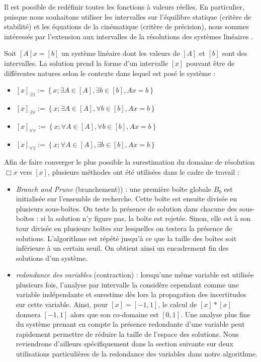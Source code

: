 Il est possible de red\'efinir toutes les fonctions \`a valeurs 
r\'eelles. En particulier, puisque nous souhaitons utiliser les intervalles 
sur l'\'equilibre statique (crit\`ere de stabilit\'e) et les \'equations de la 
cin\'ematique (crit\`ere de pr\'ecision), nous sommes int\'eress\'es par 
l'extension aux intervalles de la r\'esolutions des syst\`emes lin\'eaires 
\cite{hansen1980}.

Soit $[A]x = [b]$ un syst\`eme lin\'eaire dont les valeurs de $[A]$ et $[b]$ 
sont des intervalles. La solution prend la forme d'un intervalle $[x]$ pouvant 
\^etre de diff\'erentes natures selon le contexte dans lequel est pos\'e le 
syst\`eme :
\begin{itemize}
 \item $[x]_{\exists \exists} := \left \lbrace x ; \exists A \in [A], \exists b 
\in [b], Ax = b \right \rbrace$
 \item $[x]_{\exists \forall} := \left \lbrace x ; \exists A \in [A], \forall b 
\in [b], Ax = b \right \rbrace$
 \item $[x]_{\forall \forall} := \left \lbrace x ; \forall A \in [A], \forall b 
\in [b], Ax = b \right \rbrace$
 \item $[x]_{\forall \exists} := \left \lbrace x ; \forall A \in [A], \exists b 
\in [b], Ax = b \right \rbrace $
\end{itemize}

Afin de faire converger le plus possible la surestimation du domaine de 
r\'esolution $\Box x$ vers $[x]$, plusieurs m\'ethodes ont \'et\'e utilis\'ees 
dans le cadre de travail :
\begin{itemize}
 \item {\it Branch and Prune} (branchement)) : une premi\`ere bo\^ite globale 
$B_0$ est initialis\'ee sur l'ensemble de recherche. Cette bo\^ite est ensuite 
divis\'ee en plusieurs sous-bo\^ites. On teste la pr\'esence de solution dans 
chacune des sous-bo\^ites : si la solution n'y figure pas, la bo\^ite est 
rejet\'ee. Sinon, elle est \`a son tour divis\'ee en plusieurs bo\^ites sur 
lesquelles on testera la pr\'esence de solutions. L'algorithme est r\'ep\'et\'e 
jusqu'\`a ce que la taille des bo\^ites soit inf\'erieure \`a un certain seuil. 
On obtient ainsi un encadrement fin des solutions d'un syst\`eme.
  \item {\it redondance des variables} (contraction) : lorsqu'une m\^eme 
variable est utilis\'ee plusieurs fois, l'analyse par intervalle la consid\`ere 
cependant comme une variable ind\'ependante et surestime d\`es lors la 
propagation des incertitudes sur cette variable. Ainsi, pour $[x] = [-1,1]$, le 
calcul de $[x]*[x]$ donnera $[-1,1]$ alors que son co-domaine est $[0,1]$. 
Une analyse plus fine du syst\`eme prenant en compte la pr\'esence 
redondante d'une variable peut rapidement permettre de r\'eduire la taille 
de l'espace des solutions. Nous reviendrons d'ailleurs sp\'ecifiquement dans la 
section suivante sur deux utilisations particuli\`eres de la redondance des 
variables dans notre algorithme.  
\end{itemize}

